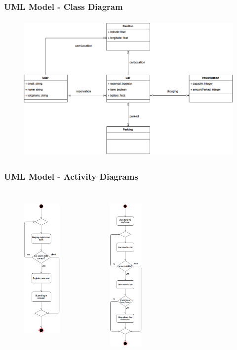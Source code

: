 \begin{frame}
	\frametitle{UML Model - Class Diagram}
	\begin{figure}[H]
		\centering
		\includegraphics[height=7.3cm,keepaspectratio]{figures/class_diagram.eps}
		\label{fig:class_diagram}
	\end{figure}
\end{frame}

\begin{frame}
	\frametitle{UML Model - Activity Diagrams}
	\begin{columns}[c]
		\begin{figure}[H]
			\centering
			\includegraphics[height=6.9cm,keepaspectratio]{figures/registration_activity_diagram.eps}
			\label{fig:registration_activity_diagram}
		\end{figure}
		\begin{figure}[H]
			\centering
			\includegraphics[height=7.6cm,keepaspectratio]{figures/reservation_activity_diagram.eps}
			\label{fig:reservation_activity_diagram}
		\end{figure}
	\end{columns}
\end{frame}

